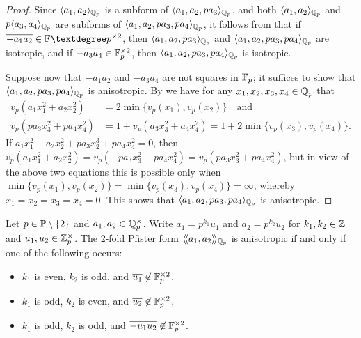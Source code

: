 \documentclass[12pt, leqno, british]{amsart}
\begin{document}
\begin{proof}
Since $\langle a_1, a_2 \rangle_{\mathbb Q_p}$ is a subform of $\langle a_1, a_2, pa_3 \rangle_{\mathbb Q_p}$, and both $\langle a_1, a_2 \rangle_{\mathbb Q_p}$ and $p\langle a_3, a_4 \rangle_{\mathbb Q_p}$ are subforms of $\langle a_1, a_2, pa_3, pa_4 \rangle_{\mathbb Q_p}$, it follows from  that if $\overline{-a_1a_2} \in \ff°p^{\times 2}$, then $\langle a_1, a_2, pa_3 \rangle_{\mathbb Q_p}$ and $\langle a_1, a_2, pa_3, pa_4 \rangle_{\mathbb Q_p}$ are isotropic, and if $\overline{-a_3a_4} \in \mathbb F_p^{\times 2}$, then $\langle a_1, a_2, pa_3, pa_4 \rangle_{\mathbb Q_p}$ is isotropic.

Suppose now that $\overline{-a_1a_2}$ and $\overline{-a_3a_4}$ are not squares in $\mathbb F_p$; it suffices to show that $\langle a_1, a_2, pa_3, pa_4 \rangle_{\mathbb Q_p}$ is anisotropic.
By  we have for any $x_1, x_2, x_3, x_4 \in \mathbb Q_p$ that
\begin{align*}
v_p(a_1x_1^2 + a_2x_2^2) &= 2\min \lbrace v_p(x_1), v_p(x_2) \rbrace \quad \text{and}\\ 
v_p(pa_3x_3^2 + pa_4x_4^2) &= 1 + v_p(a_3x_3^2 + a_4x_4^2) = 1 + 2\min \lbrace v_p(x_3), v_p(x_4) \rbrace.
\end{align*}
If $a_1x_1^2 + a_2x_2^2 + pa_3x_2^3 + pa_4x_4^2 = 0$, then $v_p(a_1x_1^2 + a_2x_2^2) = v_p(-pa_3x_3^2 - pa_4x_4^2) = v_p(pa_3x_3^2 + pa_4x_4^2)$, but in view of the above two equations this is possible only when
$\min \lbrace v_p(x_1), v_p(x_2) \rbrace = \min \lbrace v_p(x_3), v_p(x_4) \rbrace = \infty$, whereby $x_1 = x_2 = x_3 = x_4 = 0$.
This shows that $\langle a_1, a_2, pa_3, pa_4 \rangle_{\mathbb Q_p}$ is anisotropic.
\end{proof}
\begin{prop}\label{P:2-fold-Pfister-qqp-odd}
Let $p \in \mathbb P \setminus \lbrace 2 \rbrace$ and $a_1, a_2 \in \mathbb Q_p^ \times$.
Write $a_1 = p^{k_1}u_1$ and $a_2 = p^{k_2}u_2$ for $k_1, k_2 \in \mathbb Z$ and $u_1, u_2 \in \mathbb Z_p^\times$.
The $2$-fold Pfister form $\langle\!\langle a_1, a_2 \rangle\!\rangle_{\mathbb Q_p}$ is anisotropic if and only if one of the following occurs:
\begin{itemize}
\item $k_1$ is even, $k_2$ is odd, and $\overline{u_1} \not\in \mathbb F_p^{\times 2}$,
\item $k_1$ is odd, $k_2$ is even, and $\overline{u_2} \not\in \mathbb F_p^{\times 2}$,
\item $k_1$ is odd, $k_2$ is odd, and $\overline{-u_1u_2} \not\in \mathbb F_p^{\times 2}$.
\end{itemize}
\end{prop}
\end{document}
